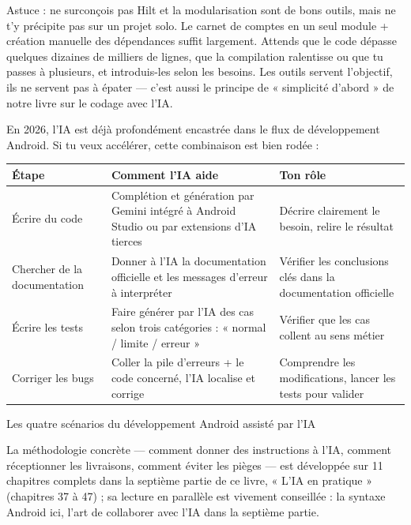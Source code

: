 \begin{tcbinfo}{Astuce : ne surconçois pas}
Hilt et la modularisation sont de bons outils, mais ne t’y précipite pas sur un projet solo. Le carnet de comptes en un seul module + création manuelle des dépendances suffit largement. Attends que le code dépasse quelques dizaines de milliers de lignes, que la compilation ralentisse ou que tu passes à plusieurs, et introduis-les selon les besoins. Les outils servent l’objectif, ils ne servent pas à épater — c’est aussi le principe de « simplicité d’abord » de notre livre sur le codage avec l’IA.

\end{tcbinfo}


En 2026, l’IA est déjà profondément encastrée dans le flux de développement Android. Si tu veux accélérer, cette combinaison est bien rodée :

\begin{center}
\begin{tabularx}{\linewidth}{|X|X|X|}
\hline
\textbf{Étape} & \textbf{Comment l’IA aide} & \textbf{Ton rôle} \tabularnewline
\hline
Écrire du code & Complétion et génération par Gemini intégré à Android Studio ou par extensions d’IA tierces & Décrire clairement le besoin, relire le résultat \tabularnewline
Chercher de la documentation & Donner à l’IA la documentation officielle et les messages d’erreur à interpréter & Vérifier les conclusions clés dans la documentation officielle \tabularnewline
Écrire les tests & Faire générer par l’IA des cas selon trois catégories : « normal / limite / erreur » & Vérifier que les cas collent au sens métier \tabularnewline
Corriger les bugs & Coller la pile d’erreurs + le code concerné, l’IA localise et corrige & Comprendre les modifications, lancer les tests pour valider \tabularnewline
\hline
\end{tabularx}
\end{center}

\begin{center}\small\color{gray}Les quatre scénarios du développement Android assisté par l’IA\end{center}

La méthodologie concrète — comment donner des instructions à l’IA, comment réceptionner les livraisons, comment éviter les pièges — est développée sur 11 chapitres complets dans la septième partie de ce livre, « L’IA en pratique » (chapitres 37 à 47) ; sa lecture en parallèle est vivement conseillée : la syntaxe Android ici, l’art de collaborer avec l’IA dans la septième partie.

